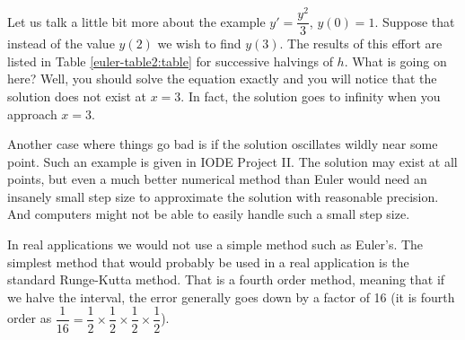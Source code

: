 \medskip

Let us talk a little bit more about the example
$y' = \dfrac{y^2}{3}$, $y(0) =
1$.  Suppose that instead of the value $y(2)$ we wish to find $y(3)$.
The results of this effort are listed in Table
\ref{euler-table2:table} for successive halvings of $h$.  What is
going on here?  Well, you should solve the equation exactly and you will
notice that the solution does not exist at $x=3$.  In fact, the solution goes
to infinity when you approach $x=3$.


Another case where things go bad is if the solution oscillates wildly
near some point.
Such an example is given in IODE Project II.  The solution
may exist at all points, but even a much better numerical method than
Euler would need an insanely small step size to approximate the solution
with reasonable precision.
And computers might not be able to easily handle such a small step size.

\medskip

In real applications we would not use a simple method such as Euler's.  The
simplest method that would probably be used in a real application is the
standard Runge-Kutta method.  That is a
fourth order method,
meaning that if we halve the interval, the error generally
goes down by a factor of 16 (it is fourth order as $\dfrac{1}{16} =
\dfrac{1}{2} \times \dfrac{1}{2}
\times \dfrac{1}{2} \times \dfrac{1}{2}$).

